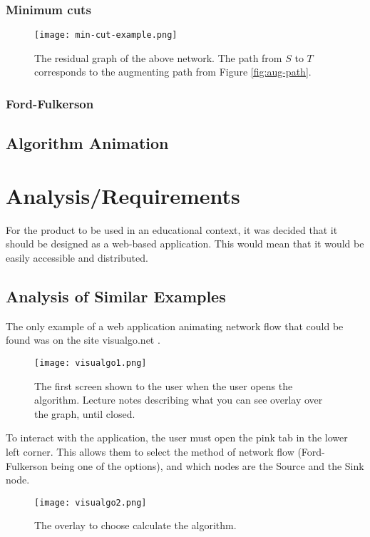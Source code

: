 \documentclass{l4proj}
\begin{document}
\subsection{Minimum cuts}

\begin{figure}[h]
    \centering
    \texttt{[image: min-cut-example.png]}
    \caption{The residual graph of the above network. The path from $S$ to $T$ corresponds to the augmenting path from Figure \ref{fig:aug-path}.}
    \label{fig:my_label}
\end{figure}

\subsection{Ford-Fulkerson}



\section{Algorithm Animation}

\begin{comment}
Teaching algorithms using a visual aid; research into that. Leads into...

\end{comment}
\chapter{Analysis/Requirements}
For the product to be used in an educational context, it was decided that it should be designed as a web-based application. This would mean that it would be easily accessible and distributed.
\section{Analysis of Similar Examples}
The only example of a web application animating network flow that could be found was on the site visualgo.net \cite{visualgo}.
\begin{figure}[h]
    \centering
    \texttt{[image: visualgo1.png]}
    \caption{The first screen shown to the user when the user opens the algorithm. Lecture notes describing what you can see overlay over the graph, until closed.}
    \label{fig:my_label}
\end{figure}

To interact with the application, the user must open the pink tab in the lower left corner. This allows them to select the method of network flow (Ford-Fulkerson being one of the options), and which nodes are the Source and the Sink node.
\begin{figure}[h]
    \centering
    \texttt{[image: visualgo2.png]}
    \caption{The overlay to choose calculate the algorithm.}
    \label{fig:my_label}
\end{figure}
\end{document}
